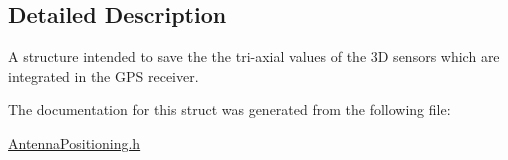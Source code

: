 \subsection{Detailed Description}
A structure intended to save the the tri-\/axial values of the 3D sensors which are integrated in the G\+PS receiver. 

The documentation for this struct was generated from the following file\+:\begin{DoxyCompactItemize}
\item 
\hyperlink{AntennaPositioning_8h}{Antenna\+Positioning.\+h}\end{DoxyCompactItemize}
